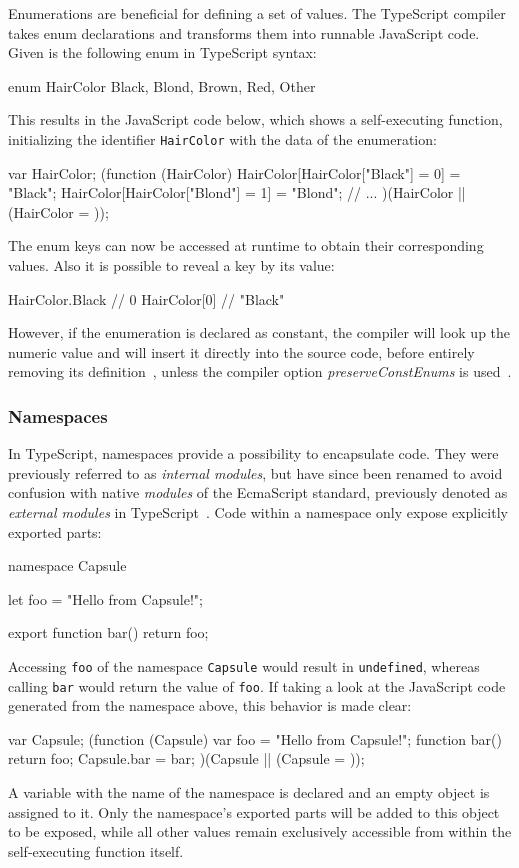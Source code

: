 Enumerations are beneficial for defining a set of values. The TypeScript compiler takes enum declarations and transforms them into runnable JavaScript code. Given is the following enum in TypeScript syntax:
\begin{JsCode}[numbers=none]
enum HairColor {
  Black, Blond, Brown, Red, Other
}
\end{JsCode}
This results in the JavaScript code below, which shows a self-executing function, initializing the identifier \texttt{HairColor} with the data of the enumeration:
\begin{JsCode}[numbers=none]
var HairColor;
(function (HairColor) {
    HairColor[HairColor["Black"] = 0] = "Black";
    HairColor[HairColor["Blond"] = 1] = "Blond";
    // ...
})(HairColor || (HairColor = {}));
\end{JsCode}
The enum keys can now be accessed at runtime to obtain their corresponding values. Also it is possible to reveal a key by its value:
\begin{JsCode}[numbers=none]
HairColor.Black // 0
HairColor[0] // "Black"
\end{JsCode}
However, if the enumeration is declared as constant, the compiler will look up the numeric value and will insert it directly into the source code, before entirely removing its definition~\cite{TypeScriptHandbook:Enums}, unless the compiler option \emph{preserveConstEnums} is used~\cite{TypeScriptHandbook:CompilerOptions}.

\subsubsection{Namespaces}

In TypeScript, namespaces provide a possibility to encapsulate code. They were previously referred to as \emph{internal modules}, but have since been renamed to avoid confusion with native \emph{modules} of the EcmaScript standard, previously denoted as \emph{external modules} in TypeScript~\cite{TypeScriptHandbook:Namespaces}. Code within a namespace only expose explicitly exported parts:
\begin{JsCode}[numbers=none]
namespace Capsule {
  let foo = "Hello from Capsule!";
  
  export function bar() {
    return foo;
  }
}
\end{JsCode}
Accessing \texttt{foo} of the namespace \texttt{Capsule} would result in \texttt{undefined}, whereas calling \texttt{bar} would return the value of \texttt{foo}. If taking a look at the JavaScript code generated from the namespace above, this behavior is made clear:
\begin{JsCode}[numbers=none]
var Capsule;
(function (Capsule) {
    var foo = "Hello from Capsule!";
    function bar() {
        return foo;
    }
    Capsule.bar = bar;
})(Capsule || (Capsule = {}));
\end{JsCode}
A variable with the name of the namespace is declared and an empty object is assigned to it. Only the namespace's exported parts will be added to this object to be exposed, while all other values 
remain exclusively accessible from within the self-executing function itself.


